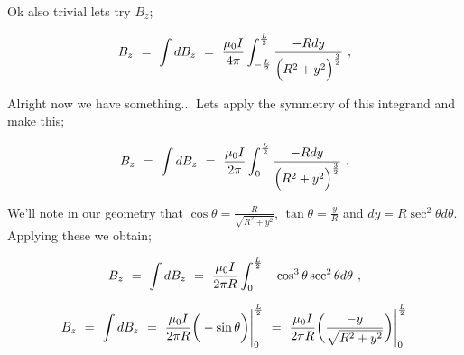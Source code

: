 \documentclass{article}
\begin{document}
Ok also trivial lets try \begin{math} B_z \end{math};

\begin{equation} \label{eb-eq-51-8}
B_z \hspace{0.125cm} = \hspace{0.125cm} \int d B_z \hspace{0.125cm} = \hspace{0.125cm} \frac{\mu_{0} I}{4 \pi} \int_{-\frac{L}{2}}^{\frac{L}{2}} \frac{-R dy}{\Big( R^2 + y^2 \Big)^\frac{3}{2}} \hspace{0.125cm} ,
\end{equation}

Alright now we have something... Lets apply the symmetry of this integrand and make this;

\begin{equation} \label{eb-eq-51-9}
B_z \hspace{0.125cm} = \hspace{0.125cm} \int d B_z \hspace{0.125cm} = \hspace{0.125cm} \frac{\mu_{0} I}{2 \pi} \int_{0}^{\frac{L}{2}} \frac{-R dy}{\Big( R^2 + y^2 \Big)^\frac{3}{2}} \hspace{0.125cm} ,
\end{equation}

We'll note in our geometry that \begin{math} \cos{\theta} = \frac{R}{\sqrt{R^2 + y^2}} \end{math}, \begin{math} \tan{\theta} = \frac{y}{R} \end{math} and \begin{math} dy = R \sec^{2}{\theta}d\theta \end{math}. Applying these we obtain;

\begin{equation} \label{eb-eq-51-10}
B_z \hspace{0.125cm} = \hspace{0.125cm} \int d B_z \hspace{0.125cm} = \hspace{0.125cm} \frac{\mu_{0} I}{2 \pi R} \int_{0}^{\frac{L}{2}} - \cos^{3}\theta \sec^{2}\theta d \theta \hspace{0.125cm} ,
\end{equation}

\begin{equation} \label{eb-eq-51-11}
B_z \hspace{0.125cm} = \hspace{0.125cm} \int d B_z \hspace{0.125cm} = \hspace{0.125cm} \frac{\mu_{0} I}{2 \pi R} \bigg( - \sin \theta \bigg) \Bigg|_{0}^{\frac{L}{2}} \hspace{0.125cm} = \hspace{0.125cm} \frac{\mu_{0} I}{2 \pi R} \bigg( \frac{-y}{\sqrt{R^2 + y^2}} \bigg) \Bigg|_{0}^{\frac{L}{2}}
\end{equation}
\end{document}
